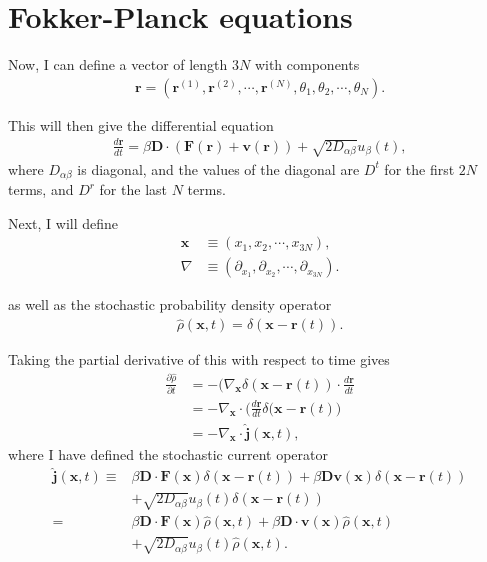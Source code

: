 \documentclass[twocolumn,amsmath,amssymb,aps]{revtex4-1}%
\begin{document}
\appendix

\section{Fokker-Planck equations\label{app:fokkerplanck}}

Now, I can define a vector of length $3N$ with components
\begin{align}
  \bm{r}=(\bm{r}^{(1)},\bm{r}^{(2)},\cdots,\bm{r}^{(N)},\theta_1,\theta_2,\cdots,
  \theta_N).
\end{align}

This will then give the differential equation
\begin{align}
  \frac{d\bm{r}}{dt}=\beta\bm{D}\cdot(\bm{F}(\bm{r})+\bm{v}(\bm{r}))
  +\sqrt{2D_{\alpha\beta}}u_{\beta}(t),
\end{align}
where $D_{\alpha\beta}$ is diagonal, and the values of the diagonal are
$D^t$ for the first $2N$ terms, and $D^r$ for the last $N$ terms.

Next, I will define
\begin{align}
  \bm{x}&\equiv(x_1,x_2,\cdots,x_{3N}),\\
  \nabla&\equiv(\partial_{x_1},\partial_{x_2},\cdots,\partial_{x_{3N}}).
\end{align}

as well as the stochastic probability density operator
\begin{align}
  \hat{\rho}(\bm{x},t)=\delta(\bm{x}-\bm{r}(t)).
\end{align}

Taking the partial derivative of this with respect to time gives
\begin{align}
  \frac{\partial\hat{\rho}}{\partial t}
  &=-(\nabla_{\bm{x}}\delta(\bm{x}-\bm{r}(t))
  \cdot\frac{d\bm{r}}{dt}\nonumber\\
  &=-\nabla_{\bm{x}}\cdot\bigg(\frac{d\bm{r}}{dt}
  \delta(\bm{x}-\bm{r}(t)\bigg)\nonumber\\
  &=-\nabla_{\bm{x}}\cdot\hat{\bm{j}}(\bm{x},t),
\end{align}
where I have defined the stochastic current operator
\begin{align}
  \hat{\bm{j}}(\bm{x},t)\equiv
  &\beta\bm{D}\cdot\bm{F}(\bm{x})\delta(\bm{x}-\bm{r}(t))
  +\beta\bm{D}\bm{v}(\bm{x})\delta(\bm{x}-\bm{r}(t))\nonumber\\
  &+\sqrt{2D_{\alpha\beta}}u_{\beta}(t)
  \delta(\bm{x}-\bm{r}(t))\nonumber\\
  =&\beta\bm{D}\cdot\bm{F}(\bm{x})\hat{\rho}(\bm{x},t)
  +\beta\bm{D}\cdot\bm{v}(\bm{x})\hat{\rho}(\bm{x},t)\nonumber\\
  &+\sqrt{2D_{\alpha\beta}}u_{\beta}(t)\hat{\rho}(\bm{x},t).
\end{align}
\end{document}
